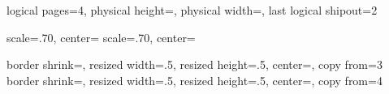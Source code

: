   {
    \edef\pgfpageoptionheight{\the\paperheight}
    \edef\pgfpageoptionwidth{\the\paperwidth}
    \edef\pgfpageoptionborder{0pt}
 }
 {
    \pgfpagesphysicalpageoptions
    {%
      logical pages=4,%
      physical height=\pgfpageoptionheight,%
      physical width=\pgfpageoptionwidth,%
      last logical shipout=2%
    }
    
        {%
                scale=.70,
                center=\pgfpoint{.25\pgfphysicalwidth}{.67\pgfphysicalheight}%
        }%
        {%
                scale=.70,
                center=\pgfpoint{.25\pgfphysicalwidth}{.33\pgfphysicalheight}%
        }%

	
    {%
      border shrink=\pgfpageoptionborder,%
      resized width=.5\pgfphysicalwidth,%
      resized height=.5\pgfphysicalheight,%
      center=\pgfpoint{.75\pgfphysicalwidth}{.67\pgfphysicalheight},%
      copy from=3
    }%
    {%
      border shrink=\pgfpageoptionborder,%
      resized width=.5\pgfphysicalwidth,%
      resized height=.5\pgfphysicalheight,%
      center=\pgfpoint{.75\pgfphysicalwidth}{.33\pgfphysicalheight},%
      copy from=4
    }%
    
 }


